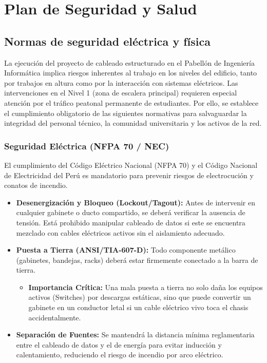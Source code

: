 \chapter{Plan de Seguridad y Salud}

\section{Normas de seguridad eléctrica y física}

La ejecución del proyecto de cableado estructurado en el Pabellón de Ingeniería Informática implica riesgos inherentes al trabajo en los \totalPisos{} niveles del edificio, tanto por trabajos en altura como por la interacción con sistemas eléctricos. Las intervenciones en el Nivel 1 (zona de escalera principal) requieren especial atención por el tráfico peatonal permanente de estudiantes. Por ello, se establece el cumplimiento obligatorio de las siguientes normativas para salvaguardar la integridad del personal técnico, la comunidad universitaria y los activos de la red.

\subsection*{Seguridad Eléctrica (NFPA 70 / NEC)}

El cumplimiento del Código Eléctrico Nacional (NFPA 70) y el Código Nacional de Electricidad del Perú es mandatorio para prevenir riesgos de electrocución y conatos de incendio.

\begin{itemize}
    \item \textbf{Desenergización y Bloqueo (Lockout/Tagout):} Antes de intervenir en cualquier gabinete o ducto compartido, se deberá verificar la ausencia de tensión. Está prohibido manipular cableado de datos si este se encuentra mezclado con cables eléctricos activos sin el aislamiento adecuado.
    \item \textbf{Puesta a Tierra (ANSI/TIA-607-D):} Todo componente metálico (gabinetes, bandejas, racks) deberá estar firmemente conectado a la barra de tierra.
    \begin{itemize}
        \item \textbf{Importancia Crítica:} Una mala puesta a tierra no solo daña los equipos activos (Switches) por descargas estáticas, sino que puede convertir un gabinete en un conductor letal si un cable eléctrico vivo toca el chasis accidentalmente.
    \end{itemize}
    \item \textbf{Separación de Fuentes:} Se mantendrá la distancia mínima reglamentaria entre el cableado de datos y el de energía para evitar inducción y calentamiento, reduciendo el riesgo de incendio por arco eléctrico.
\end{itemize}

